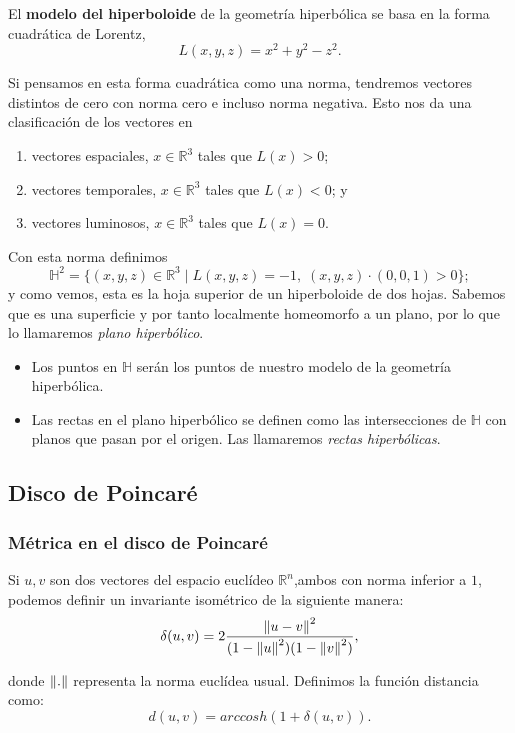 \documentclass{article}
\theoremstyle{plain}
\theoremstyle{definition}
\theoremstyle{remark}
\newcommand{\norm}[1]{\ensuremath\left\Vert #1 \right\Vert}
\begin{document}
El \textbf{modelo del hiperboloide} de la geometría hiperbólica se
basa en la forma cuadrática de Lorentz,
\[L(x,y,z)=x^2+y^2-z^2.\]

Si pensamos en esta forma cuadrática como una norma, tendremos vectores
distintos de cero con norma cero e incluso norma negativa. Esto nos da
una clasificación de los vectores en

\begin{enumerate}
\item vectores espaciales, $x\in\mathbb{R}^3$ tales que $L(x)>0$;
\item vectores temporales, $x\in\mathbb{R}^3$ tales que $L(x)<0$; y
\item vectores luminosos, $x\in\mathbb{R}^3$ tales que $L(x)=0$.
\end{enumerate}

Con esta norma definimos
\[\mathbb{H}^2=\{(x,y,z)\in\mathbb{R}^3 \mid L(x,y,z)=-1,\; (x,y,z) \cdot (0,0,1) > 0 \};\]
y como vemos, esta es la hoja superior de un hiperboloide de dos
hojas. Sabemos que es una superficie y por tanto localmente
homeomorfo a un plano, por lo que lo llamaremos \textit{plano hiperbólico}.

\begin{itemize}
\item Los puntos en $\mathbb{H}$ serán los puntos de nuestro modelo
  de la geometría hiperbólica.
\item Las rectas en el plano hiperbólico se definen como las intersecciones
  de $\mathbb{H}$ con planos que pasan por el origen. Las llamaremos
  \textit{rectas hiperbólicas}.
\end{itemize}



\subsection{Disco de Poincaré}

\subsubsection{Métrica en el disco de Poincaré}
Si $u,v$ son dos vectores del espacio euclídeo $\mathbb{R}^n$,ambos
con norma inferior a $1$, podemos definir un invariante isométrico de
la siguiente manera:
\[\delta (u,v)=2\frac{\norm{u-v}^2}{(1-\norm{u}^2)(1-\norm{v}^2)},\]

donde $\norm{.}$ representa la norma euclídea usual. Definimos la
función distancia como:
\[d(u,v)=arccosh(1+\delta(u,v)).\]
\end{document}
